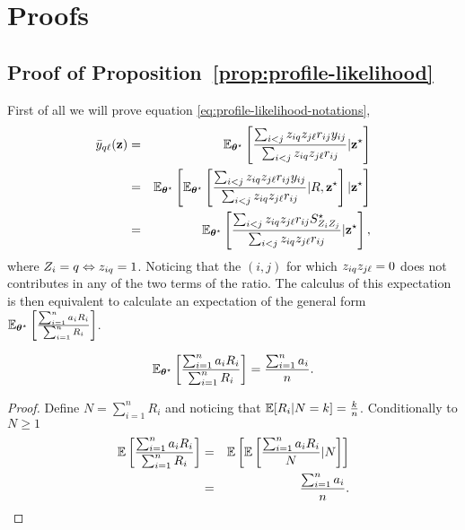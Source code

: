 \section{Proofs}
\label{sec:proofPL}



\subsection{Proof of Proposition~\ref{prop:profile-likelihood}} 
\proofbegin

First of all we will prove equation \ref{eq:profile-likelihood-notations},
\begin{eqnarray*}
 \barykl(\bz) &=& \Esp_{\bthetas}\left[\frac{\sum_{i<j}\ziq\zjl\rrij\yij}{\sum_{i<j}\ziq\zjl\rrij} | \bzs\right] \\
 &=& \Esp_{\bthetas}\left[\Esp_{\bthetas}\left[\frac{\sum_{i<j}\ziq\zjl\rrij\yij}{\sum_{i<j}\ziq\zjl\rrij} | R, \bzs\right]| \bzs\right] \\
 &=& \Esp_{\bthetas}\left[\frac{\sum_{i<j}\ziq\zjl\rrij S_{Z_{i} Z_{j}}^{\star}}{\sum_{i<j}\ziq\zjl\rrij}| \bzs\right],\\
 \end{eqnarray*}
where $Z_{i} = q \Leftrightarrow z_{i q} = 1$. Noticing that the $(i,j)$ for which $z_{i q}z_{j\ell}=0$ does not contributes in any of the two terms of the ratio. The calculus of this expectation is then equivalent to calculate an expectation of the general form $\mathbb{E}_{\boldsymbol{\theta}^\star}\left[ \frac{\sum_{i=1}^{n} a_i R_i}{\sum_{i=1}^{n} R_i} \right]$.
\begin{lemme}
$$\mathbb{E}_{\boldsymbol{\theta}^\star}\left[ \frac{\sum_{i=1}^{n} a_i R_i}{\sum_{i=1}^{n} R_i} \right] = \frac{\sum_{i=1}^{n}a_i}{n}.$$
\label{lem:expectation}
\end{lemme}
\begin{proof}
Define $N=\sum_{i=1}^{n}R_i$ and noticing that $\mathbb{E}[R_i | N=k]=\frac{k}{n}$. Conditionally to $N \geq 1$ \begin{eqnarray*}
\Esp\left[ \frac{\sum_{i=1}^{n} a_i R_i}{\sum_{i=1}^{n} R_i} \right] &=& \Esp\left[\Esp\left[ \frac{\sum_{i=1}^{n} a_i R_i}{N} | N\right]\right] \\
&=& \frac{\sum_{i=1}^{n}a_i}{n}. 
\end{eqnarray*}
\end{proof}

